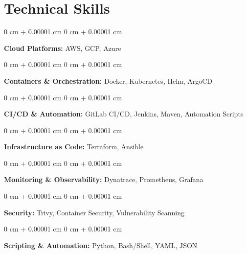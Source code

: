 \documentclass[10pt, letterpaper]{article}
\newenvironment{onecolentry}{
    \begin{adjustwidth}{
        0 cm + 0.00001 cm
    }{
        0 cm + 0.00001 cm
    }
}{
    \end{adjustwidth}
} %
\begin{document}
    \section{Technical Skills}
    
    \begin{onecolentry}
    \textbf{Cloud Platforms:} AWS, GCP, Azure
    \end{onecolentry}
    
    \vspace{0.2 cm}
    
    \begin{onecolentry}
    \textbf{Containers \& Orchestration:} Docker, Kubernetes, Helm, ArgoCD
    \end{onecolentry}
    
    \vspace{0.2 cm}
    
    \begin{onecolentry}
    \textbf{CI/CD \& Automation:} GitLab CI/CD, Jenkins, Maven, Automation Scripts
    \end{onecolentry}
    
    \vspace{0.2 cm}
    
    \begin{onecolentry}
    \textbf{Infrastructure as Code:} Terraform, Ansible
    \end{onecolentry}
    
    \vspace{0.2 cm}
    
    \begin{onecolentry}
    \textbf{Monitoring \& Observability:} Dynatrace, Prometheus, Grafana
    \end{onecolentry}
    
    \vspace{0.2 cm}
    
    \begin{onecolentry}
    \textbf{Security:} Trivy, Container Security, Vulnerability Scanning
    \end{onecolentry}
    
    \vspace{0.2 cm}
    
    \begin{onecolentry}
    \textbf{Scripting \& Automation:} Python, Bash/Shell, YAML, JSON
    \end{onecolentry}
    
    \vspace{0.2 cm}
    
\end{document}
